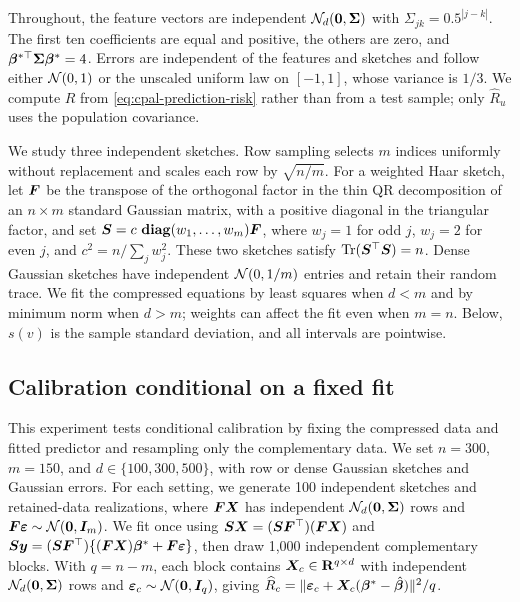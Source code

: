 \documentclass{article}
\theoremstyle{plain} %
\theoremstyle{definition} %
\theoremstyle{definition} %
\newcommand{\hR}{\hat{R}}
\begin{document}
Throughout, the feature vectors are independent
${\mathcal N}_d(\mathbf{0},\boldsymbol{\Sigma})$ with $\Sigma_{jk}=0.5^{|j-k|}$. The first
ten coefficients are equal and positive, the others are zero, and
$\boldsymbol{\beta}^{*\top}\boldsymbol{\Sigma}\boldsymbol{\beta}^*=4$. Errors are independent of the features
and sketches and follow either ${\mathcal N}(0,1)$ or the unscaled uniform law on
$[-1,1]$, whose variance is $1/3$. We compute $R$ from
\eqref{eq:cpal-prediction-risk} rather than from a test sample; only
$\hR_u$ uses the population covariance.

We study three independent sketches. Row sampling selects $m$ indices
uniformly without replacement and scales each row by $\sqrt{n/m}$. For a
weighted Haar sketch, let $\boldsymbol{F}$ be the transpose of the orthogonal factor
in the thin QR decomposition of an $n\times m$ standard Gaussian matrix,
with a positive diagonal in the triangular factor, and set
$\boldsymbol{S}=c\,\operatorname{\mathbf{diag}}(w_1,\ldots,w_m)\boldsymbol{F}$, where $w_j=1$ for odd $j$, $w_j=2$
for even $j$, and $c^2=n/\sum_jw_j^2$. These two sketches satisfy
$\operatorname{Tr}(\boldsymbol{S}^\top\boldsymbol{S})=n$. Dense Gaussian sketches have independent
${\mathcal N}(0,1/m)$ entries and retain their random trace. We fit the compressed
equations by least squares when $d<m$ and by minimum norm when $d>m$;
weights can affect the fit even when $m=n$. Below, $s(v)$ is the sample
standard deviation, and all intervals are pointwise.

\subsection{Calibration conditional on a fixed fit}
\label{sec:cpal-conditional-study}

This experiment tests conditional calibration by fixing the compressed
data and fitted predictor and resampling only the complementary data. We
set $n=300$, $m=150$, and $d\in\{100,300,500\}$, with row or dense
Gaussian sketches and Gaussian errors. For each setting, we generate 100
independent sketches and retained-data realizations, where $\boldsymbol{F}\boldsymbol{X}$ has
independent ${\mathcal N}_d(\mathbf{0},\boldsymbol{\Sigma})$ rows and
$\boldsymbol{F}{\boldsymbol{\varepsilon} }\sim{\mathcal N}(\mathbf{0},\boldsymbol{I}_m)$. We fit once using
$\boldsymbol{S}\boldsymbol{X}=(\boldsymbol{S}\boldsymbol{F}^\top)(\boldsymbol{F}\boldsymbol{X})$ and
$\boldsymbol{S}\boldsymbol{y}=(\boldsymbol{S}\boldsymbol{F}^\top)\{(\boldsymbol{F}\boldsymbol{X})\boldsymbol{\beta}^*+\boldsymbol{F}{\boldsymbol{\varepsilon} }\}$, then draw 1,000
independent complementary blocks. With $q=n-m$, each block contains
$\boldsymbol{X}_c\in{\mathbf{R}}^{q\times d}$ with independent
${\mathcal N}_d(\mathbf{0},\boldsymbol{\Sigma})$ rows and
${\boldsymbol{\varepsilon} }_c\sim{\mathcal N}(\mathbf{0},\boldsymbol{I}_q)$, giving
$\widehat R_c=\lVert{\boldsymbol{\varepsilon} }_c+\boldsymbol{X}_c(\boldsymbol{\beta}^*-\hat{\boldsymbol{\beta}}{})\rVert^2/q$.
\end{document}
